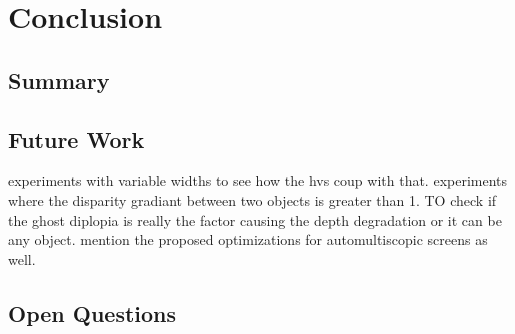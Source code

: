 \chapter{Conclusion}

\section{Summary}

\section{Future Work}
experiments with variable widths to see how the hvs coup with that.
experiments where the disparity gradiant between two objects is greater than 1. TO check if the ghost diplopia is really the factor causing the depth degradation or it can be any object.
mention the proposed optimizations for automultiscopic screens as well.

\section{Open Questions}